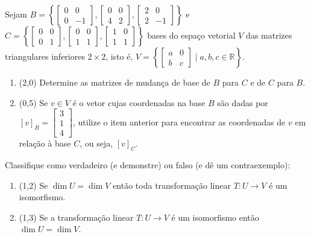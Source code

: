 \documentclass[12pt,a4paper]{article}
\newcommand{\fixme}{{\color{red}(...)}}
\newcommand*\R{\mathbb{R}}
\begin{document}
\begin{ExerciseList}
\Exercise[title={2,5}] Sejam $B = \left\{ \begin{bmatrix}
0 & 0\\ 0 & -1
\end{bmatrix}, \begin{bmatrix}
0 & 0\\ 4 & 2
\end{bmatrix}, \begin{bmatrix}
2 & 0\\ 2 & -1
\end{bmatrix}\right\}$ e $C = \left\{ \begin{bmatrix}
0 & 0\\ 0 & 1
\end{bmatrix}, \begin{bmatrix}
0 & 0\\ 1 & 1
\end{bmatrix}, \begin{bmatrix}
1 & 0\\ 1 & 1
\end{bmatrix}\right\}$ bases do espaço vetorial $V$ das matrizes triangulares inferiores $2 \times 2$, isto é, $V = \left\{ \begin{bmatrix}
a & 0\\ b & c
\end{bmatrix} \mid a,b,c \in \R \right\}$.
\begin{enumerate}
\item (2,0) Determine as matrizes de mudança de base de $B$ para $C$ e de $C$ para $B$.
\item (0,5) Se $v \in V$ é o vetor cujas coordenadas na base $B$ são dadas por $[v]_B =
\begin{bmatrix}
3 \\
1 \\
4
\end{bmatrix}$, utilize o item anterior para encontrar as coordenadas de $v$ em relação à base $C$, ou seja, $[v]_C$.
\end{enumerate}
\Answer \fixme

\Exercise[title={2,5}]
Classifique como verdadeiro (e demonstre) ou falso (e dê um contraexemplo):
\begin{enumerate}
\item (1,2) Se $\dim{U} = \dim{V}$ então toda transformação linear $T: U \to V$ é um isomorfismo.
\item (1,3) Se a transformação linear $T: U \to V$ é um isomorfismo então $\dim{U} = \dim{V}$.
\end{enumerate}
\Answer \fixme


\end{ExerciseList}
\end{document}
